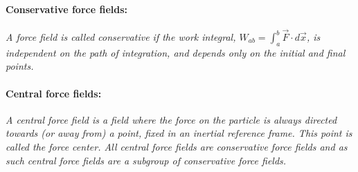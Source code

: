 \paragraph{Conservative force fields:} \emph{A force field is called conservative if the work integral, $W_{ab}=\int_{a}^{b}\vec{F}\cdot d\vec{x}$, is independent on the path of integration, and depends only on the initial and final points.}

\paragraph{Central force fields:}  \emph{A central force field is a field where the force on the particle is always directed towards (or away from) a point, fixed in an inertial reference frame. This point is called the force center. All central force fields are conservative force fields and as such central force fields are a subgroup of conservative force fields.}\newline

